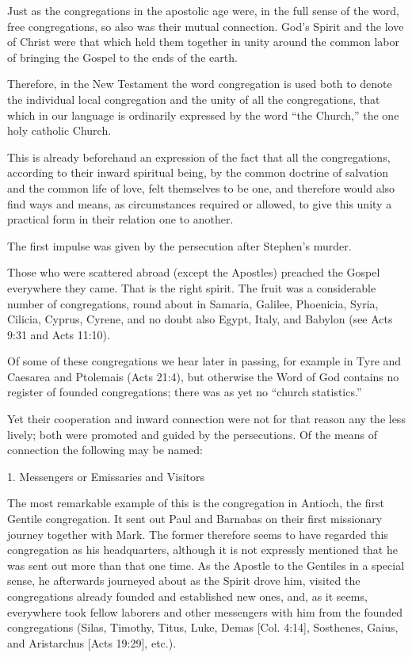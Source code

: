 Just as the congregations in the apostolic age were, in the full sense of the word, free congregations, so also was their mutual connection. God’s Spirit and the love of Christ were that which held them together in unity around the common labor of bringing the Gospel to the ends of the earth.

Therefore, in the New Testament the word congregation is used both to denote the individual local congregation and the unity of all the congregations, that which in our language is ordinarily expressed by the word “the Church,” the one holy catholic Church.

This is already beforehand an expression of the fact that all the congregations, according to their inward spiritual being, by the common doctrine of salvation and the common life of love, felt themselves to be one, and therefore would also find ways and means, as circumstances required or allowed, to give this unity a practical form in their relation one to another.

The first impulse was given by the persecution after Stephen’s murder.

Those who were scattered abroad (except the Apostles) preached the Gospel everywhere they came. That is the right spirit. The fruit was a considerable number of congregations, round about in Samaria, Galilee, Phoenicia, Syria, Cilicia, Cyprus, Cyrene, and no doubt also Egypt, Italy, and Babylon (see Acts 9:31 and Acts 11:10).

Of some of these congregations we hear later in passing, for example in Tyre and Caesarea and Ptolemais (Acts 21:4), but otherwise the Word of God contains no register of founded congregations; there was as yet no “church statistics.”

Yet their cooperation and inward connection were not for that reason any the less lively; both were promoted and guided by the persecutions. Of the means of connection the following may be named:

1. Messengers or Emissaries and Visitors

The most remarkable example of this is the congregation in Antioch, the first Gentile congregation. It sent out Paul and Barnabas on their first missionary journey together with Mark. The former therefore seems to have regarded this congregation as his headquarters, although it is not expressly mentioned that he was sent out more than that one time. As the Apostle to the Gentiles in a special sense, he afterwards journeyed about as the Spirit drove him, visited the congregations already founded and established new ones, and, as it seems, everywhere took fellow laborers and other messengers with him from the founded congregations (Silas, Timothy, Titus, Luke, Demas [Col. 4:14], Sosthenes, Gaius, and Aristarchus [Acts 19:29], etc.).

